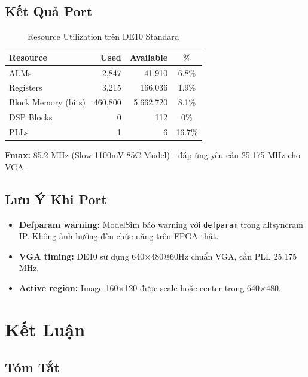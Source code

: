 \documentclass[12pt,a4paper]{article}
\begin{document}
\subsection{Kết Quả Port}

\begin{table}[H]
\centering
\caption{Resource Utilization trên DE10 Standard}
\begin{tabular}{|l|r|r|c|}
\hline
\textbf{Resource} & \textbf{Used} & \textbf{Available} & \textbf{\%} \\
\hline
ALMs & 2,847 & 41,910 & 6.8\% \\
\hline
Registers & 3,215 & 166,036 & 1.9\% \\
\hline
Block Memory (bits) & 460,800 & 5,662,720 & 8.1\% \\
\hline
DSP Blocks & 0 & 112 & 0\% \\
\hline
PLLs & 1 & 6 & 16.7\% \\
\hline
\end{tabular}
\end{table}

\textbf{Fmax:} 85.2 MHz (Slow 1100mV 85C Model) - đáp ứng yêu cầu 25.175 MHz cho VGA.

\subsection{Lưu Ý Khi Port}

\begin{itemize}
    \item \textbf{Defparam warning:} ModelSim báo warning với \texttt{defparam} trong altsyncram IP. Không ảnh hưởng đến chức năng trên FPGA thật.
    \item \textbf{VGA timing:} DE10 sử dụng 640$\times$480@60Hz chuẩn VGA, cần PLL 25.175 MHz.
    \item \textbf{Active region:} Image 160$\times$120 được scale hoặc center trong 640$\times$480.
\end{itemize}

\section{Kết Luận}

\subsection{Tóm Tắt}
\end{document}
